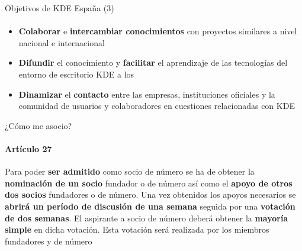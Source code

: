 \documentclass[12pt]{beamer}
\begin{document}
\begin{frame}{Objetivos de KDE España (3)}
  \framesubtitle{}
  \begin{itemize}
    \item \textbf{Colaborar} e \textbf{intercambiar conocimientos} con proyectos similares a nivel nacional e internacional
    \item \textbf{Difundir} el conocimiento y \textbf{facilitar} el aprendizaje de las tecnologías del entorno de escritorio KDE a los
    \item \textbf{Dinamizar} el \textbf{contacto} entre las empresas, instituciones oficiales y la comunidad de usuarios y colaboradores en cuestiones relacionadas con KDE
  \end{itemize}
\end{frame}

\begin{frame}{¿Cómo me asocio?}
  \framesubtitle{Artículo 27}
  Para poder \textbf{ser admitido} como socio de número se ha de obtener la \textbf{nominación de un socio} fundador o de número así como el \textbf{apoyo de otros dos socios} fundadores o de número. Una vez obtenidos los apoyos necesarios se \textbf{abrirá un período de discusión de una semana} seguida por una \textbf{votación de dos semanas}. El aspirante a socio de número deberá obtener la \textbf{mayoría simple} en dicha votación. Esta votación será realizada por los miembros fundadores y de número
\end{frame}

\end{document}
